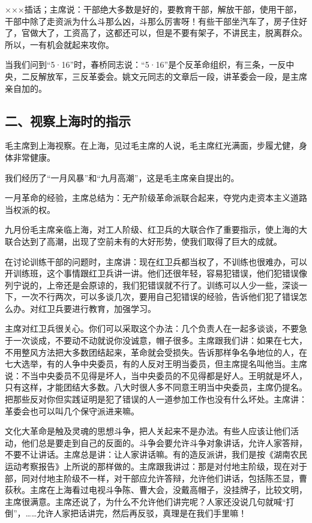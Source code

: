 ×××插话；主席说：干部绝大多数是好的，要教育干部，解放干部，使用干部，干部中除了走资派为什么斗那么凶，斗那么厉害呀！有些干部坐汽车了，房子住好了，官做大了，工资高了，这都还可以，但是不要有架子，不讲民主，脱离群众。所以，一有机会就起来攻你。

当我们问到“5·16”时，春桥同志说：“5·16”是个反革命组织，有三条，一反中央，二反解放军，三反革委会。姚文元同志的文章后一段，讲革委会一段，是主席亲自加的。

\subsection{二、视察上海时的指示}


毛主席到上海视察。在上海，见过毛主席的人说，毛主席红光满面，步履尤健，身体非常健康。

我们经历了“一月风暴”和“九月高潮”，这是毛主席亲自提出的。

一月革命的经验，主席总结为：无产阶级革命派联合起来，夺党内走资本主义道路当权派的权。

九月份毛主席亲临上海，对工人阶级、红卫兵的大联合作了重要指示，使上海的大联合达到了高潮，出现了空前未有的大好形势，使我们取得了巨大的成就。


在讨论训练干部的问题时，主席讲：现在红卫兵都当权了，不训练也很难办，可以开训练班，这个事情跟红卫兵讲一讲。他们还很年轻，容易犯错误，他们犯错误像列宁说的，上帝还是会原谅的，我们犯错误就不行了。训练可以人少一些，深谈一下，一次不行两次，可以多谈几次，要用自己犯错误的经验，告诉他们犯了错误怎么办。对红卫兵要进行教育，加强学习。

主席对红卫兵很关心。你们可以采取这个办法：几个负责人在一起多谈谈，不要急于一次谈成，不要动不动就说你没诚意，帽子很多。主席跟我们讲：如果在七大，不用整风方法把大多数团结起来，革命就会受损失。告诉那样争名争地位的人，在七大选举，有的人争中央委员，有的人反对王明当委员，但主席提名叫他当。主席说：不当中央委员不见得是坏人，当中央委员的不见得都是好人。王明就是坏人，只有这样，才能团结大多数。八大时很人多不同意王明当中央委员，主席仍提名。把那些反对你但实践证明是犯了错误的人一道参加工作也没有什么坏处。主席讲：革委会也可以叫几个保守派进来嘛。

文化大革命是触及灵魂的思想斗争，把人关起来不是办法。有些人应该让他们活动，他们总是要走到自己的反面的。斗争会要允许斗争对象讲话，允许人家答辩，不要不让讲话。主席总是讲：让人家讲话嘛。有的造反派讲，我们是按《湖南农民运动考察报告》上所说的那样做的。主席跟我讲过：那是对付地主阶级，现在对于部，同对付地主阶级不一样，对干部应允许答辩，允许他们讲话，包括陈丕显，曹荻秋。主席在上海看过电视斗争陈、曹大会，没戴高帽子，没挂牌子，比较文明，主席很满意。主席还说了，为什么不允许他们讲完呢？人家还没说几句就喊“打倒”，……允许人家把话讲完，然后再反驳，真理是在我们手里嘛！

